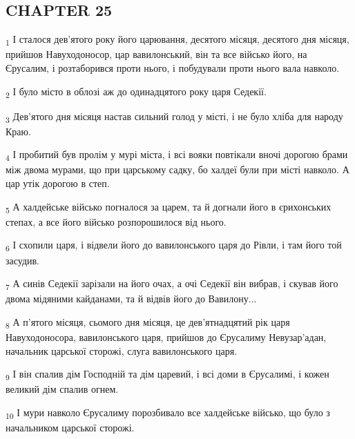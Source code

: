 \subsection{CHAPTER 25}
\begin{tcolorbox}
\textsubscript{1} І сталося дев'ятого року його царювання, десятого місяця, десятого дня місяця, прийшов Навуходоносор, цар вавилонський, він та все військо його, на Єрусалим, і розтаборився проти нього, і побудували проти нього вала навколо.
\end{tcolorbox}
\begin{tcolorbox}
\textsubscript{2} І було місто в облозі аж до одинадцятого року царя Седекії.
\end{tcolorbox}
\begin{tcolorbox}
\textsubscript{3} Дев'ятого дня місяця настав сильний голод у місті, і не було хліба для народу Краю.
\end{tcolorbox}
\begin{tcolorbox}
\textsubscript{4} І пробитий був пролім у мурі міста, і всі вояки повтікали вночі дорогою брами між двома мурами, що при царському садку, бо халдеї були при місті навколо. А цар утік дорогою в степ.
\end{tcolorbox}
\begin{tcolorbox}
\textsubscript{5} А халдейське військо погналося за царем, та й догнали його в єрихонських степах, а все його військо розпорошилося від нього.
\end{tcolorbox}
\begin{tcolorbox}
\textsubscript{6} І схопили царя, і відвели його до вавилонського царя до Рівли, і там його той засудив.
\end{tcolorbox}
\begin{tcolorbox}
\textsubscript{7} А синів Седекії зарізали на його очах, а очі Седекії він вибрав, і скував його двома мідяними кайданами, та й відвів його до Вавилону...
\end{tcolorbox}
\begin{tcolorbox}
\textsubscript{8} А п'ятого місяця, сьомого дня місяця, це дев'ятнадцятий рік царя Навуходоносора, вавилонського царя, прийшов до Єрусалиму Невузар'адан, начальник царської сторожі, слуга вавилонського царя.
\end{tcolorbox}
\begin{tcolorbox}
\textsubscript{9} І він спалив дім Господній та дім царевий, і всі доми в Єрусалимі, і кожен великий дім спалив огнем.
\end{tcolorbox}
\begin{tcolorbox}
\textsubscript{10} І мури навколо Єрусалиму порозбивало все халдейське військо, що було з начальником царської сторожі.
\end{tcolorbox}
